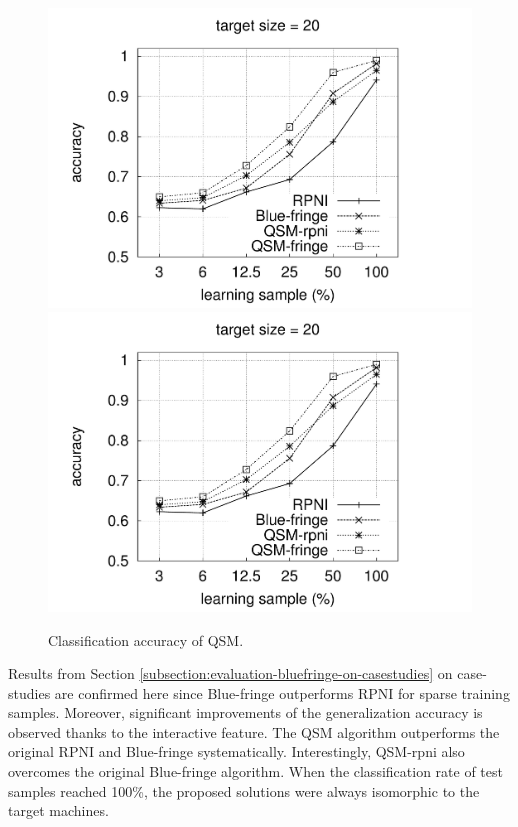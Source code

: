 \begin{figure}
{  \includegraphics[trim=0mm  0mm 45mm 0mm, clip, page=3]{src/5-evaluation/images/accuracy}
  \includegraphics[trim=30mm 0mm 35mm 0mm, clip, page=4]{src/5-evaluation/images/accuracy}
}
\caption{Classification accuracy of QSM\label{image:evaluation-qsm-accuracy}.}
\end{figure}

Results from Section \ref{subsection:evaluation-bluefringe-on-casestudies} on case-studies are confirmed here since Blue-fringe outperforms RPNI for sparse training samples. Moreover, significant improvements of the generalization accuracy is observed thanks to the interactive feature. The QSM algorithm outperforms the original RPNI and Blue-fringe systematically. Interestingly, QSM-rpni also overcomes the original Blue-fringe algorithm. When the classification rate of test samples reached 100\%, the proposed solutions were always isomorphic to the target machines.

